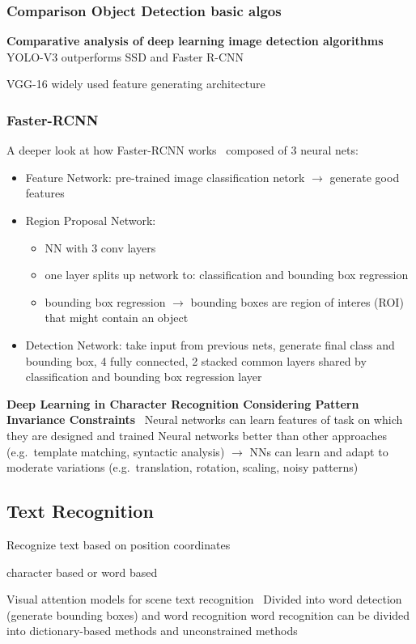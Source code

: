 \subsubsection*{Comparison Object Detection basic algos}
\textbf{Comparative analysis of deep learning image detection
algorithms}~\citep{srivastava_comparative_2021}
YOLO-V3 outperforms SSD and Faster R-CNN

VGG-16 widely used feature generating architecture

\subsubsection*{Faster-RCNN}
A deeper look at how Faster-RCNN works~\citep{goswami_deeper_2018}
composed of 3 neural nets:
\begin{itemize}
    \item Feature Network: pre-trained image classification netork $\rightarrow$ generate good features
    \item Region Proposal Network:
        \begin{itemize}
            \item NN with 3 conv layers
            \item one layer splits up network to: classification and bounding box regression
            \item bounding box regression $\rightarrow$ bounding boxes are region of interes (ROI)
                that might contain an object
        \end{itemize}
    \item Detection Network: take input from previous nets, generate final class and bounding box,
        4 fully connected, 2 stacked common layers shared by classification and bounding box regression
        layer \end{itemize}

\textbf{Deep Learning in Character Recognition Considering Pattern Invariance
Constraints}~\citep{oyedotun_deep_2015}
Neural networks can learn features of task on which they are designed and trained
Neural networks better than other approaches (e.g.\ template matching, syntactic analysis)
$\rightarrow$ NNs can learn and adapt to moderate variations (e.g.\ translation, rotation, scaling,
noisy patterns)

\subsection*{Text Recognition}
Recognize text based on position coordinates

character based or word based

Visual attention models for scene text recognition~\citep{ghosh_visual_2017}
Divided into word detection (generate bounding boxes) and word recognition
word recognition can be divided into dictionary-based methods and unconstrained methods
